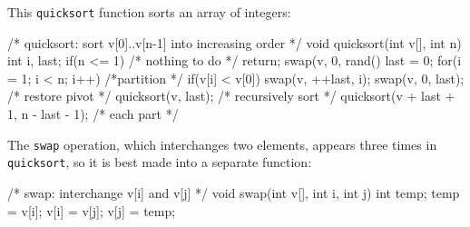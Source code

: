 This \verb'quicksort' function sorts an array of integers:
\begin{wellcode}
    /* quicksort: sort v[0]..v[n-1] into increasing order */
    void quicksort(int v[], int n)
    {
        int i, last;
        if(n <= 1) /* nothing to do */
            return;
        swap(v, 0, rand() %
        last = 0;
        for(i = 1; i < n; i++)  /*partition */
            if(v[i] < v[0])
                swap(v, ++last, i);
        swap(v, 0, last);   /* restore pivot */
        quicksort(v, last); /* recursively sort */
        quicksort(v + last + 1, n - last - 1); /* each part */
    }
\end{wellcode}

The \verb'swap' operation, which interchanges two elements, appears three
times in \verb'quicksort', so it is best made into a separate function:
\begin{wellcode}
    /* swap: interchange v[i] and v[j] */
    void swap(int v[], int i, int j)
    {
        int temp;
        temp = v[i];
        v[i] = v[j];
        v[j] = temp;
    }
\end{wellcode}

